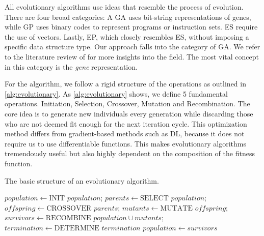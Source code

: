 \documentclass[./../../paper.tex]{subfiles}
\begin{document}





All evolutionary algorithms use ideas that resemble the process of evolution. There are four broad categories: A \gls{GA} uses bit-string representations of genes, while \gls{GP} uses binary codes to represent programs or instruction sets. \gls{ES} require the use of vectors. Lastly, \gls{EP}, which closely resembles \gls{ES}, without imposing a specific data structure type\autocites{lambora_GeneticAlgorithmLiterature_2019,vikhar_Evolutionaryalgorithmscritical_2016}. Our approach falls into the category of \gls{GA}. We refer to the literature review of \citeauthor{vikhar_Evolutionaryalgorithmscritical_2016} for more insights into the field. The most vital concept in this category is the \emph{gene} representation. 

For the algorithm, we follow a rigid structure of the operations as outlined in \autoref{alg:evolutionary}. 
As \autoref{alg:evolutionary} shows, we define 5 fundamental operations. Initiation, Selection, Crossover, Mutation and Recombination. 
The core idea is to generate new individuals every generation while discarding those who are not deemed fit enough for the next iteration cycle. This optimization method differs from gradient-based methods such as \gls{DL}, because it does not require us to use differentiable functions. This makes evolutionary algorithms tremendously useful but also highly dependent on the composition of the fitness function.

\begin{algorithm}[htb!]
    \caption{The basic structure of an evolutionary algorithm.}
    \begin{algorithmic}
        \State $population \gets \text{INIT } population$;
        \State $parents \gets \text{SELECT } population$;
        \State $offspring \gets \text{CROSSOVER } parents$;
        \State $mutants \gets \text{MUTATE } offspring$;
        \State $survivors \gets \text{RECOMBINE } population \cup mutants$;
        \State $termination \gets \text{DETERMINE } termination$
        \State $population \gets survivors$
        \EndWhile
    \end{algorithmic}
    \label{alg:evolutionary}
\end{algorithm}
\end{document}
